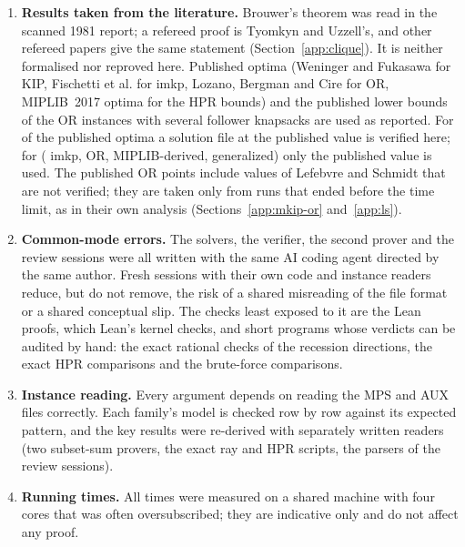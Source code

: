 \begin{enumerate}
\item \textbf{Results taken from the literature.} Brouwer's
theorem\cite{brouwer1981lotto} was read in the scanned 1981 report; a refereed
proof is Tyomkyn and Uzzell's,\cite{tyomkyn2015strong} and other refereed papers
give the same statement (Section~\ref{app:clique}). It is neither formalised nor
reproved here. Published optima (Weninger and
Fukasawa\cite{weninger2025fast} for KIP, Fischetti et
al.\cite{fischetti2019interdiction} for imkp, Lozano, Bergman and
Cire\cite{lozano2026network} for OR, MIPLIB~2017 optima\cite{gleixner2021miplib}
for the HPR bounds) and the published lower bounds of the
OR instances with several follower knapsacks are used as reported. For
\NumLitWithFile{} of the \NumLitOptimal{} published optima a solution file at
the published value is verified here; for \NumLitNoFile{}
(\NumLitNoFileImkp{} imkp, \NumLitNoFileOr{} OR, \NumLitNoFileMiplib{}
MIPLIB-derived, \NumLitNoFileGeneralized{} generalized) only the published value
is used. The published OR points include values of Lefebvre and
Schmidt\cite{lefebvre2025dantzig} that are not verified; they are taken only
from runs that ended before the time limit, as in their own analysis
(Sections~\ref{app:mkip-or} and~\ref{app:ls}).

\item \label{it:common}\textbf{Common-mode errors.} The solvers, the verifier,
the second prover and the review sessions were all written with the same AI
coding agent directed by the same author. Fresh sessions with their own code
and instance readers reduce, but do not remove, the risk of a shared
misreading of the file format or a shared conceptual slip. The checks least
exposed to it are the Lean proofs, which Lean's kernel checks, and short
programs whose verdicts can be audited by hand: the exact rational checks of
the recession directions, the exact HPR comparisons and the brute-force
comparisons.

\item \textbf{Instance reading.} Every argument depends on reading the MPS
and AUX files correctly. Each family's model is checked row by row against
its expected pattern, and the key results were re-derived with separately
written readers (two subset-sum provers, the exact ray and HPR scripts, the
parsers of the review sessions).

\item \textbf{Running times.} All times were measured on a shared machine
with four cores that was often oversubscribed; they are indicative only and
do not affect any proof.
\end{enumerate}

